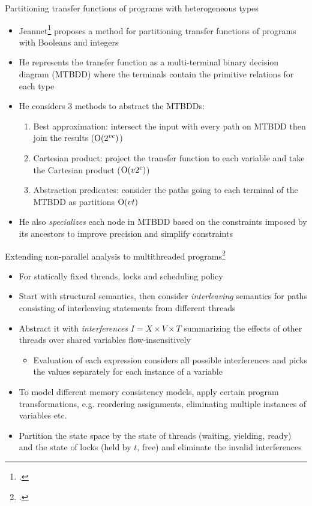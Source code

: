 \documentclass[aspectratio=169]{beamer}
\begin{document}
\begin{frame}{Partitioning transfer functions of programs with heterogeneous types}
  \small
  \begin{itemize}
  \item Jeannet\footcite{jeannet_representing_2002} proposes a method for partitioning transfer functions of programs with Booleans and integers
  \item He represents the transfer function as a multi-terminal binary decision diagram (MTBDD) where the terminals contain the primitive relations for each type
  \item He considers 3 methods to abstract the MTBDDs:
    \begin{enumerate}
    \item Best approximation: intersect the input with every path on MTBDD then join the results ($\operatorname{O}(2^{vc})$)
    \item Cartesian product: project the transfer function to each variable and take the Cartesian product ($\operatorname{O}(v2^{c})$)
    \item Abstraction predicates: consider the paths going to each terminal of the MTBDD as partitions $\operatorname{O}(vt)$
    \end{enumerate}
  \item He also \emph{specializes} each node in MTBDD based on the constraints imposed by its ancestors to improve precision and simplify constraints
  \end{itemize}
\end{frame}

\begin{frame}{Extending non-parallel analysis to multithreaded programs\footcite{mine2011static}}
  \footnotesize
  \begin{itemize}[<+->]
  \item For statically fixed threads, locks and scheduling policy
  \item Start with structural semantics, then consider \emph{interleaving} semantics for paths consisting of interleaving statements from different threads
  \item Abstract it with \emph{interferences} $I = X \times V \times T$ summarizing the effects of other threads over shared variables flow-insensitively
    \begin{itemize}[<+->]\footnotesize
    \item Evaluation of each expression considers all possible interferences and picks the values separately for each instance of a variable
    \end{itemize}
  \item To model different memory consistency models, apply certain program transformations, e.g. reordering assignments, eliminating multiple instances of variables etc.
  \item Partition the state space by the state of threads (waiting, yielding, ready) and the state of locks (held by $t$, free) and eliminate the invalid interferences
  \end{itemize}
\end{frame}
\end{document}
